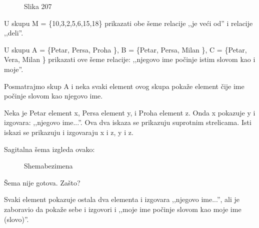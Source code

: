     \begin{figure}[H] 

        \center


        \caption{Slika 207}

        \label{Slika207}

    \end{figure}



    \begin{zad}

        U skupu M = \{10,3,2,5,6,15,18\} prikazati obe \v seme relacije ,,je ve\' ci od'' i relacije ,,deli''.

    \end{zad}



    \begin{zad}

        U skupu A = \{Petar, Persa, Proha \}, B = \{Petar, Persa, Milan \}, C = \{Petar, Vera, Milan \} prikazati ove \v seme relacije: ,,njegovo ime po\v cinje istim slovom kao i moje''.



        Posmatrajmo skup A i neka svaki element ovog skupa poka\v ze element \v cije ime po\v cinje slovom kao njegovo ime.

    \end{zad}



    Neka je Petar element x, Persa element y, i Proha element z. Onda x pokazuje y i izgovara: ,,njegovo ime...''. Ova dva iskaza se prikazuju suprotnim strelicama. Isti iskazi se prikazuju i izgovaraju x i z, y i z.



    Sagitalna \v sema izgleda ovako:



    \begin{figure}[H] 

        \center


        \caption{Shemabezimena}

        \label{Shemabezimena}

    \end{figure}



    \v Sema nije gotova. Za\v sto?



    Svaki element pokazuje ostala dva elementa i izgovara ,,njegovo ime...'', ali je zaboravio da poka\v ze sebe i izgovori i ,,moje ime po\v cinje slovom kao moje ime (slovo)''.



